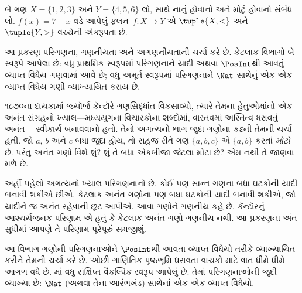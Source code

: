 \begin{ex}
બે ગણ $X=\{1,2,3\}$ અને $Y=\{4,5,6\}$ લો,
સાથે નાનું હોવાનો અને મોટું હોવાનો સંબંધ લો.
$f(x) = 7-x$ વડે આપેલું ફલન~$f\colon X \to Y$
એ $\tuple{X,<}$ અને $\tuple{Y,>}$ વચ્ચેની એકરૂપતા છે.
\end{ex}
\endgroup
\endgroup


\begingroup
\makeatletter{}\makeatother

\label{guunit:OLP-0027}


\begin{editorial}
આ પ્રકરણ પરિગણના, ગણનીયતા અને અગણનીયતાની ચર્ચા કરે છે.
કેટલાક વિભાગો બે સ્વરૂપે આપેલા છે: વધુ પ્રાથમિક સ્વરૂપમાં
પરિગણનાને યાદી અથવા $\PosInt$થી આવતું વ્યાપ્ત વિધેય
ગણવામાં આવે છે; વધુ અમૂર્ત સ્વરૂપમાં પરિગણનાને
$\Nat$ સાથેનું એક-એક વ્યાપ્ત વિધેય ગણી વ્યાખ્યાયિત કરાય છે.
\end{editorial}

\begingroup
\makeatletter{}\makeatother


\label{guunit:OLP-0028}


૧૮૭૦ના દાયકામાં જ્યૉર્જ કૅન્ટૉરે ગણસિદ્ધાંત વિકસાવ્યો,
ત્યારે તેમના હેતુઓમાંનો એક અનંત સંગ્રહનો ખ્યાલ---મધ્યયુગના
વિચારકોના શબ્દોમાં, વાસ્તવમાં અસ્તિત્વ ધરાવતું અનંત---
સ્વીકાર્ય બનાવવાનો હતો. તેનો અગત્યનો ભાગ જુદા ગણોના
\emph{કદ}ની તેમની ચર્ચા હતી. જો $a$, $b$ અને $c$
બધા જુદા હોય, તો સહજ રીતે ગણ $\{a, b, c\}$ એ
$\{a, b\}$ કરતાં \emph{મોટો} છે. પરંતુ અનંત ગણો વિશે
શું? શું તે બધા એકબીજા જેટલા મોટા છે? એમ નથી તે જાણવા મળે છે.

અહીં પહેલો અગત્યનો ખ્યાલ પરિગણનાનો છે. કોઈ પણ સાન્ત
ગણના બધા ઘટકોની યાદી બનાવી શકીએ છીએ.
કેટલાક અનંત ગણોના પણ બધા ઘટકોની યાદી બનાવી
શકીએ, જો યાદીને જ અનંત રહેવાની છૂટ આપીએ.
આવા ગણોને ગણનીય કહે છે. કૅન્ટૉરનું આશ્ચર્યજનક
પરિણામ એ હતું કે કેટલાક અનંત ગણો ગણનીય નથી.
આ પ્રકરણના અંત સુધીમાં આપણે તે પરિણામ પૂરેપૂરું સમજીશું.
\endgroup


\begingroup
\makeatletter{}\makeatother


\label{guunit:OLP-0029}


\begin{editorial}
આ વિભાગ ગણોની પરિગણનાઓને $\PosInt$થી આવતા વ્યાપ્ત
વિધેયો તરીકે વ્યાખ્યાયિત કરીને તેમની ચર્ચા કરે છે.
ઓછી ગાણિતિક પૃષ્ઠભૂમિ ધરાવતા વાચકો માટે વાત ધીમે ધીમે
આગળ વધે છે. માં વધુ સંક્ષિપ્ત
વૈકલ્પિક સ્વરૂપ આપેલું છે. તેમાં પરિગણનાઓની જુદી વ્યાખ્યા
છે: $\Nat$ (અથવા તેના આરંભખંડ) સાથેનાં એક-એક
વ્યાપ્ત વિધેયો.
\end{editorial}

